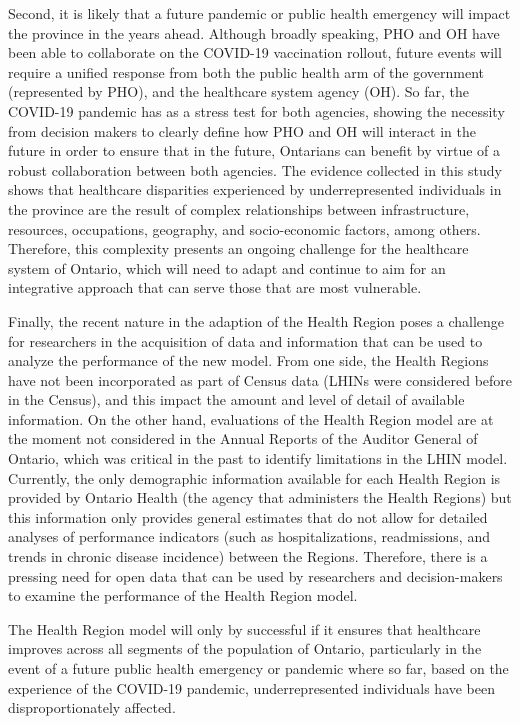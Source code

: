 \documentclass[
]{article}
\begin{document}
Second, it is likely that a future pandemic or public health emergency
will impact the province in the years ahead. Although broadly speaking,
PHO and OH have been able to collaborate on the COVID-19 vaccination
rollout, future events will require a unified response from both the
public health arm of the government (represented by PHO), and the
healthcare system agency (OH). So far, the COVID-19 pandemic has as a
stress test for both agencies, showing the necessity from decision
makers to clearly define how PHO and OH will interact in the future in
order to ensure that in the future, Ontarians can benefit by virtue of a
robust collaboration between both agencies. The evidence collected in
this study shows that healthcare disparities experienced by
underrepresented individuals in the province are the result of complex
relationships between infrastructure, resources, occupations, geography,
and socio-economic factors, among others. Therefore, this complexity
presents an ongoing challenge for the healthcare system of Ontario,
which will need to adapt and continue to aim for an integrative approach
that can serve those that are most vulnerable.

Finally, the recent nature in the adaption of the Health Region poses a
challenge for researchers in the acquisition of data and information
that can be used to analyze the performance of the new model. From one
side, the Health Regions have not been incorporated as part of Census
data (LHINs were considered before in the Census), and this impact the
amount and level of detail of available information. On the other hand,
evaluations of the Health Region model are at the moment not considered
in the Annual Reports of the Auditor General of Ontario, which was
critical in the past to identify limitations in the LHIN model.
Currently, the only demographic information available for each Health
Region is provided by Ontario Health (the agency that administers the
Health Regions) but this information only provides general estimates
that do not allow for detailed analyses of performance indicators (such
as hospitalizations, readmissions, and trends in chronic disease
incidence) between the Regions. Therefore, there is a pressing need for
open data that can be used by researchers and decision-makers to examine
the performance of the Health Region model.

The Health Region model will only by successful if it ensures that
healthcare improves across all segments of the population of Ontario,
particularly in the event of a future public health emergency or
pandemic where so far, based on the experience of the COVID-19 pandemic,
underrepresented individuals have been disproportionately affected.
\end{document}
